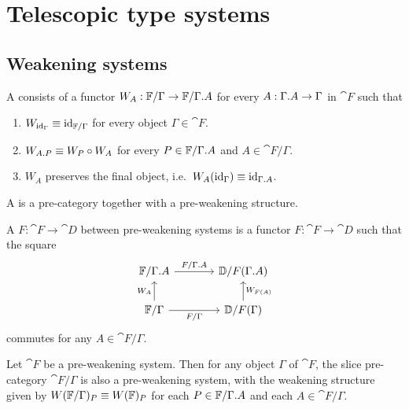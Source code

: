 \section{Telescopic type systems}\label{sec:esys_defn}

\subsection{Weakening systems}

\begin{defn}
A  consists of a functor
$W_A:\cat{F}/\Gamma\to \cat{F}/\ctxext{\Gamma}{A}$ for every $A:\ctxext{\Gamma}{A}\to \Gamma$ in $\cat{F}$ such 
that
\begin{enumerate}
\item $W_{{\mathrm{id}_{\Gamma}}}\equiv {\mathrm{id}_{\mathbb{F}/\Gamma}}$ for every object $\Gamma\in\cat{F}$.
\item $W_{\ctxext{A}{P}}\jdeq W_P\circ W_A$ for every $P\in\cat{F}/\ctxext{\Gamma}{A}$ and $A\in\cat{F}/\Gamma$.
\item $W_A$ preserves the final object, i.e.~$W_A(\catid{\Gamma})\jdeq \catid{\ctxext{\Gamma}{A}}$.
\end{enumerate}
A  is a pre-category together with a pre-weakening structure.
\end{defn}

\begin{defn}
A  $F:\cat{F}\to\cat{D}$ between pre-weakening systems
is a functor $F:\cat{F}\to\cat{D}$ such that the square
\begin{equation*}
\begin{tikzcd}[column sep=large]
\cat{F}/\ctxext{\Gamma}{A}
  \arrow[r,"F/\ctxext{\Gamma}{A}"]
  &
\cat{D}/F(\ctxext{\Gamma}{A})
  \\
\cat{F}/\Gamma
  \arrow[u,"W_A"]
  \arrow[r,swap,"F/\Gamma"]
  &
\cat{D}/F(\Gamma)
  \arrow[u,swap,"W_{F(A)}"]
\end{tikzcd}
\end{equation*}
commutes for any $A\in\cat{F}/\Gamma$.
\end{defn}

\begin{lem}
Let $\cat{F}$ be a pre-weakening system. Then for any object $\Gamma$ of $\cat{F}$,
the slice pre-category $\cat{F}/\Gamma$ is also a pre-weakening system, with the weakening
structure given by $W(\mathbb{F}/\Gamma)_P\equiv W(\mathbb{F})_P$ for each $P\in\cat{F}/\ctxext{\Gamma}{A}$
and each $A\in\cat{F}/\Gamma$.
\end{lem}

